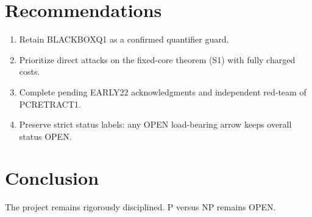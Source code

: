 \documentclass[11pt]{article}
\begin{document}
\section{Recommendations}
\begin{enumerate}
\item Retain BLACKBOXQ1 as a confirmed quantifier guard.
\item Prioritize direct attacks on the fixed-core theorem (S1) with fully charged costs.
\item Complete pending EARLY22 acknowledgments and independent red-team of PCRETRACT1.
\item Preserve strict status labels: any OPEN load-bearing arrow keeps overall status OPEN.
\end{enumerate}

\section{Conclusion}
The project remains rigorously disciplined.  P versus NP remains OPEN.

\end{document}
